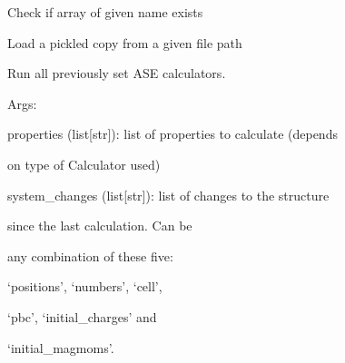 \documentclass[letterpaper,10pt,english]{sphinxmanual}
\begin{document}
\begin{fulllineitems}
\begin{fulllineitems}
\label{doctree/soprano.collection.collection:soprano.collection.collection.AtomsCollection.has}
Check if array of given name exists

\end{fulllineitems}


\begin{fulllineitems}
\label{doctree/soprano.collection.collection:soprano.collection.collection.AtomsCollection.length}
\end{fulllineitems}


\begin{fulllineitems}
\label{doctree/soprano.collection.collection:soprano.collection.collection.AtomsCollection.load}
Load a pickled copy from a given file path

\end{fulllineitems}


\begin{fulllineitems}
\label{doctree/soprano.collection.collection:soprano.collection.collection.AtomsCollection.run_calculators}
Run all previously set ASE calculators.

\begin{DUlineblock}{0em}
\item[] Args:
\item[]
\begin{DUlineblock}{\DUlineblockindent}
\item[] properties (list{[}str{]}): list of properties to calculate (depends
\item[]
\begin{DUlineblock}{\DUlineblockindent}
\item[] on type of Calculator used)
\end{DUlineblock}
\item[] system\_changes (list{[}str{]}): list of changes to the structure
\item[]
\begin{DUlineblock}{\DUlineblockindent}
\item[] since the last calculation. Can be
\item[] any combination of these five:
\item[] `positions', `numbers', `cell',
\item[] `pbc', `initial\_charges' and
\item[] `initial\_magmoms'.
\end{DUlineblock}
\end{DUlineblock}
\end{DUlineblock}


\end{fulllineitems}
\end{fulllineitems}
\end{document}
